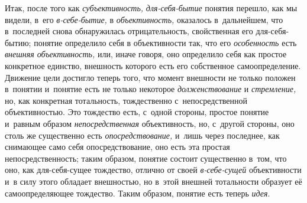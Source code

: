 Итак, после того как
{\em субъективность,}
{\em для-себя-бытие}
понятия перешло, как мы видели, в~его
{\em в-себе-бытие,} в
{\em объективность,}
оказалось в~дальнейшем, что в~последней снова обнаружилась
отрицательность, свойственная его для-себя-бытию; понятие определило себя в
объективности так, что его
{\em особенность} есть
{\em внешняя объективность,}
или, иначе говоря, оно определило себя как простое конкретное
единство, внешность которого есть его собственное самоопределение. Движение
цели достигло теперь того, что момент внешности не только положен в~понятии
и~понятие есть не только некоторое
{\em долженствование} и
{\em стремление,} но, как
конкретная тотальность, тождественно с~непосредственной объективностью. Это
тождество есть, с~одной стороны, простое понятие и~равным образом
{\em непосредственная}
объективность, но, с~другой стороны, оно столь же существенно
есть {\em опосредствование,}
и~лишь через последнее, как снимающее само себя
опосредствование, оно есть эта простая непосредственность; таким образом,
понятие состоит существенно в~том, что оно, как для-себя-сущее тождество,
отлично от своей
{\em в-себе-сущей}
объективности и~в силу этого обладает внешностью, но в~этой
внешней тотальности образует её самоопределяющее тождество. Таким образом,
понятие есть теперь {\em идея}.

\clearpage

